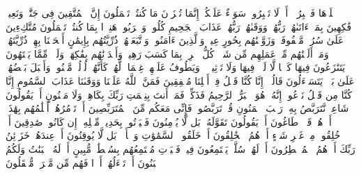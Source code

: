\startbuffer[\q:52:16]
ٱصۡلَوۡهَا فَٱصۡبِرُوۤا۟ أَوۡ لَا تَصۡبِرُوا۟ سَوَاۤءٌ عَلَیۡكُمۡۖ إِنَّمَا تُجۡزَوۡنَ مَا كُنتُمۡ تَعۡمَلُونَ%
\stopbuffer
\startbuffer[\q:52:17]
إِنَّ ٱلۡمُتَّقِینَ فِی جَنَّٰتࣲ وَنَعِیمࣲ%
\stopbuffer
\startbuffer[\q:52:18]
فَٰكِهِینَ بِمَاۤ ءَاتَىٰهُمۡ رَبُّهُمۡ وَوَقَىٰهُمۡ رَبُّهُمۡ عَذَابَ ٱلۡجَحِیمِ%
\stopbuffer
\startbuffer[\q:52:19]
كُلُوا۟ وَٱشۡرَبُوا۟ هَنِیۤءَۢا بِمَا كُنتُمۡ تَعۡمَلُونَ%
\stopbuffer
\startbuffer[\q:52:20]
مُتَّكِءِینَ عَلَىٰ سُرُرࣲ مَّصۡفُوفَةࣲۖ وَزَوَّجۡنَٰهُم بِحُورٍ عِینࣲ%
\stopbuffer
\startbuffer[\q:52:21]
وَٱلَّذِینَ ءَامَنُوا۟ وَٱتَّبَعَتۡهُمۡ ذُرِّیَّتُهُم بِإِیمَٰنٍ أَلۡحَقۡنَا بِهِمۡ ذُرِّیَّتَهُمۡ وَمَاۤ أَلَتۡنَٰهُم مِّنۡ عَمَلِهِم مِّن شَیۡءࣲۚ كُلُّ ٱمۡرِئِۭ بِمَا كَسَبَ رَهِینࣱ%
\stopbuffer
\startbuffer[\q:52:22]
وَأَمۡدَدۡنَٰهُم بِفَٰكِهَةࣲ وَلَحۡمࣲ مِّمَّا یَشۡتَهُونَ%
\stopbuffer
\startbuffer[\q:52:23]
یَتَنَٰزَعُونَ فِیهَا كَأۡسࣰا لَّا لَغۡوࣱ فِیهَا وَلَا تَأۡثِیمࣱ%
\stopbuffer
\startbuffer[\q:52:24]
۞ وَیَطُوفُ عَلَیۡهِمۡ غِلۡمَانࣱ لَّهُمۡ كَأَنَّهُمۡ لُؤۡلُؤࣱ مَّكۡنُونࣱ%
\stopbuffer
\startbuffer[\q:52:25]
وَأَقۡبَلَ بَعۡضُهُمۡ عَلَىٰ بَعۡضࣲ یَتَسَاۤءَلُونَ%
\stopbuffer
\startbuffer[\q:52:26]
قَالُوۤا۟ إِنَّا كُنَّا قَبۡلُ فِیۤ أَهۡلِنَا مُشۡفِقِینَ%
\stopbuffer
\startbuffer[\q:52:27]
فَمَنَّ ٱللَّهُ عَلَیۡنَا وَوَقَىٰنَا عَذَابَ ٱلسَّمُومِ%
\stopbuffer
\startbuffer[\q:52:28]
إِنَّا كُنَّا مِن قَبۡلُ نَدۡعُوهُۖ إِنَّهُۥ هُوَ ٱلۡبَرُّ ٱلرَّحِیمُ%
\stopbuffer
\startbuffer[\q:52:29]
فَذَكِّرۡ فَمَاۤ أَنتَ بِنِعۡمَتِ رَبِّكَ بِكَاهِنࣲ وَلَا مَجۡنُونٍ%
\stopbuffer
\startbuffer[\q:52:30]
أَمۡ یَقُولُونَ شَاعِرࣱ نَّتَرَبَّصُ بِهِۦ رَیۡبَ ٱلۡمَنُونِ%
\stopbuffer
\startbuffer[\q:52:31]
قُلۡ تَرَبَّصُوا۟ فَإِنِّی مَعَكُم مِّنَ ٱلۡمُتَرَبِّصِینَ%
\stopbuffer
\startbuffer[\q:52:32]
أَمۡ تَأۡمُرُهُمۡ أَحۡلَٰمُهُم بِهَٰذَاۤۚ أَمۡ هُمۡ قَوۡمࣱ طَاغُونَ%
\stopbuffer
\startbuffer[\q:52:33]
أَمۡ یَقُولُونَ تَقَوَّلَهُۥۚ بَل لَّا یُؤۡمِنُونَ%
\stopbuffer
\startbuffer[\q:52:34]
فَلۡیَأۡتُوا۟ بِحَدِیثࣲ مِّثۡلِهِۦۤ إِن كَانُوا۟ صَٰدِقِینَ%
\stopbuffer
\startbuffer[\q:52:35]
أَمۡ خُلِقُوا۟ مِنۡ غَیۡرِ شَیۡءٍ أَمۡ هُمُ ٱلۡخَٰلِقُونَ%
\stopbuffer
\startbuffer[\q:52:36]
أَمۡ خَلَقُوا۟ ٱلسَّمَٰوَٰتِ وَٱلۡأَرۡضَۚ بَل لَّا یُوقِنُونَ%
\stopbuffer
\startbuffer[\q:52:37]
أَمۡ عِندَهُمۡ خَزَاۤئِنُ رَبِّكَ أَمۡ هُمُ ٱلۡمُصَۣیۡطِرُونَ%
\stopbuffer
\startbuffer[\q:52:38]
أَمۡ لَهُمۡ سُلَّمࣱ یَسۡتَمِعُونَ فِیهِۖ فَلۡیَأۡتِ مُسۡتَمِعُهُم بِسُلۡطَٰنࣲ مُّبِینٍ%
\stopbuffer
\startbuffer[\q:52:39]
أَمۡ لَهُ ٱلۡبَنَٰتُ وَلَكُمُ ٱلۡبَنُونَ%
\stopbuffer
\startbuffer[\q:52:40]
أَمۡ تَسۡءَلُهُمۡ أَجۡرࣰا فَهُم مِّن مَّغۡرَمࣲ مُّثۡقَلُونَ%
